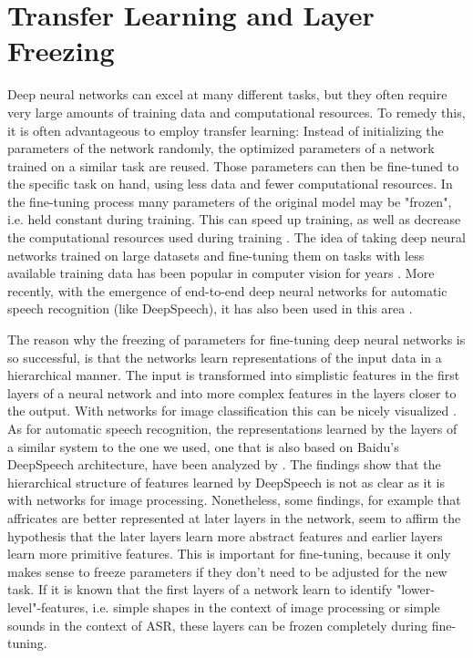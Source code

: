 \documentclass[11pt]{article}
\begin{document}
\section{Transfer Learning and Layer Freezing}
Deep neural networks can excel at many different tasks, but they often require very large amounts of training data and computational resources. To remedy this, it is often advantageous to employ transfer learning: Instead of initializing the parameters of the network randomly, the optimized parameters of a network trained on a similar task are reused. Those parameters can then be fine-tuned to the specific task on hand, using less data and fewer computational resources. In the fine-tuning process many parameters of the original model may be "frozen", i.e. held constant during training. This can speed up training, as well as decrease the computational resources used during training \parencite{DBLP:conf/rep4nlp/KunzeKKKJS17}. The idea of taking deep neural networks trained on large datasets and fine-tuning them on tasks with less available training data has been popular in computer vision for years \parencite{huh2016makes}. More recently, with the emergence of end-to-end deep neural networks for automatic speech recognition (like DeepSpeech), it has also been used in this area \parencite{DBLP:conf/rep4nlp/KunzeKKKJS17, DBLP:journals/corr/abs-1911-09271}.

The reason why the freezing of parameters for fine-tuning deep neural networks is so successful, is that the networks learn representations of the input data in a hierarchical manner. The input is transformed into simplistic features in the first layers of a neural network and into more complex features in the layers closer to the output. With networks for image classification this can be nicely visualized \parencite{10.1007/978-3-319-10590-1_53}. As for automatic speech recognition, the representations learned by the layers of a similar system to the one we used, one that is also based on Baidu's DeepSpeech architecture, have been analyzed by \textcite{NIPS2017}. The findings show that the hierarchical structure of features learned by DeepSpeech is not as clear as it is with networks for image processing. Nonetheless, some findings, for example that affricates are better represented at later layers in the network, seem to affirm the hypothesis that the later layers learn more abstract features and earlier layers learn more primitive features. This is important for fine-tuning, because it only makes sense to freeze parameters if they don't need to be adjusted for the new task. If it is known that the first layers of a network learn to identify "lower-level"-features, i.e. simple shapes in the context of image processing or simple sounds in the context of ASR, these layers can be frozen completely during fine-tuning.
\end{document}
